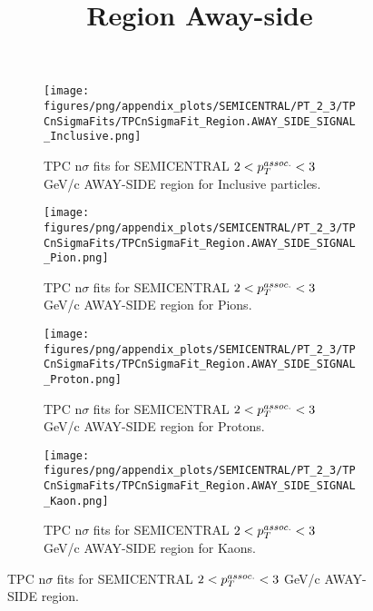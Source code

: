             \begin{figure}[H]
                \title{Region Away-side}
                \begin{subfigure}[b]{0.5\textwidth}
                    \centering
                    \texttt{[image: figures/png/appendix\_plots/SEMICENTRAL/PT\_2\_3/TPCnSigmaFits/TPCnSigmaFit\_Region.AWAY\_SIDE\_SIGNAL\_Inclusive.png]}
                    \caption{TPC n$\sigma$ fits for SEMICENTRAL $2 < \pTassoc < 3$ GeV/c AWAY-SIDE region for Inclusive particles.}
                    \label{fig:appendix_SEMICENTRAL_$2 < \pTassoc < 3$ GeV/c_AWAY_SIDE_SIGNAL_Inclusive}
                \end{subfigure}
                \begin{subfigure}[b]{0.5\textwidth}
                    \centering
                    \texttt{[image: figures/png/appendix\_plots/SEMICENTRAL/PT\_2\_3/TPCnSigmaFits/TPCnSigmaFit\_Region.AWAY\_SIDE\_SIGNAL\_Pion.png]}
                    \caption{TPC n$\sigma$ fits for SEMICENTRAL $2 < \pTassoc < 3$ GeV/c AWAY-SIDE region for Pions.}
                    \label{fig:appendix_SEMICENTRAL_$2 < \pTassoc < 3$ GeV/c_AWAY_SIDE_SIGNAL_Pion}
                \end{subfigure}
                \begin{subfigure}[b]{0.5\textwidth}
                    \centering
                    \texttt{[image: figures/png/appendix\_plots/SEMICENTRAL/PT\_2\_3/TPCnSigmaFits/TPCnSigmaFit\_Region.AWAY\_SIDE\_SIGNAL\_Proton.png]}
                    \caption{TPC n$\sigma$ fits for SEMICENTRAL $2 < \pTassoc < 3$ GeV/c AWAY-SIDE region for Protons.}
                    \label{fig:appendix_SEMICENTRAL_$2 < \pTassoc < 3$ GeV/c_AWAY_SIDE_SIGNAL_Proton}
                \end{subfigure}
                \begin{subfigure}[b]{0.5\textwidth}
                    \centering
                    \texttt{[image: figures/png/appendix\_plots/SEMICENTRAL/PT\_2\_3/TPCnSigmaFits/TPCnSigmaFit\_Region.AWAY\_SIDE\_SIGNAL\_Kaon.png]}
                    \caption{TPC n$\sigma$ fits for SEMICENTRAL $2 < \pTassoc < 3$ GeV/c AWAY-SIDE region for Kaons.}
                    \label{fig:appendix_SEMICENTRAL_$2 < \pTassoc < 3$ GeV/c_AWAY_SIDE_SIGNAL_Kaon}
                \end{subfigure}
                \caption{TPC n$\sigma$ fits for SEMICENTRAL $2 < \pTassoc < 3$ GeV/c AWAY-SIDE region.}
                \label{fig:appendix_SEMICENTRAL_$2 < \pTassoc < 3$ GeV/c_AWAY_SIDE_SIGNAL}
            \end{figure}
